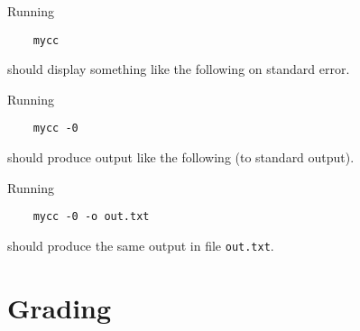 \documentclass{article}
\begin{document}
Running 
\begin{verbatim}
    mycc
\end{verbatim}
should display something like the following on standard error.

%
%
Running 
\begin{verbatim}
    mycc -0
\end{verbatim}
should produce output like the following (to standard output).

%
%
Running
\begin{verbatim}
    mycc -0 -o out.txt
\end{verbatim}
should produce the same output in file {\tt out.txt}.

\section{Grading}
\end{document}
